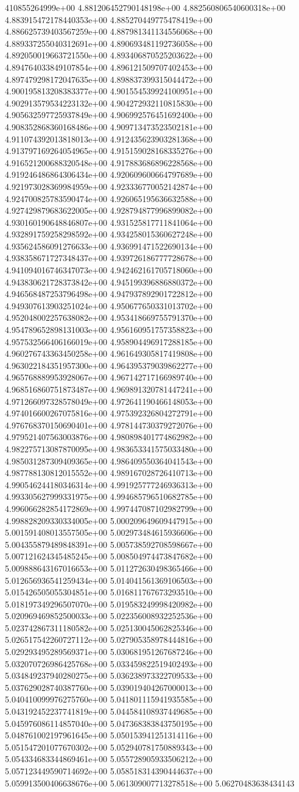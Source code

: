 410855264999e+00	4.881206452790148198e+00	4.882560806540600318e+00	4.883915472178440353e+00	4.885270449775478419e+00	4.886625739403567259e+00	4.887981341134556068e+00	4.889337255040312691e+00	4.890693481192736058e+00	4.892050019663721550e+00	4.893406870525203622e+00	4.894764033849107854e+00	4.896121509707402453e+00	4.897479298172047635e+00	4.898837399315044472e+00	4.900195813208383377e+00	4.901554539924100951e+00	4.902913579534223132e+00	4.904272932110815830e+00	4.905632597725937849e+00	4.906992576451692400e+00	4.908352868360168486e+00	4.909713473523502181e+00	4.911074392013818013e+00	4.912435623903281368e+00	4.913797169264054965e+00	4.915159028168335276e+00	4.916521200688320548e+00	4.917883686896228568e+00	4.919246486864306434e+00	4.920609600664797689e+00	4.921973028369984959e+00	4.923336770052142874e+00	4.924700825783590474e+00	4.926065195636632588e+00	4.927429879683622005e+00	4.928794877996899082e+00	4.930160190648846807e+00	4.931525817711841064e+00	4.932891759258298592e+00	4.934258015360627248e+00	4.935624586091276633e+00	4.936991471522690134e+00	4.938358671727348437e+00	4.939726186777728678e+00	4.941094016746347073e+00	4.942462161705718060e+00	4.943830621728373842e+00	4.945199396886880372e+00	4.946568487253796498e+00	4.947937892901722812e+00	4.949307613903251024e+00	4.950677650331013702e+00	4.952048002257638082e+00	4.953418669755791370e+00	4.954789652898131003e+00	4.956160951757358823e+00	4.957532566406166019e+00	4.958904496917288185e+00	4.960276743363450258e+00	4.961649305817419808e+00	4.963022184351957300e+00	4.964395379039862277e+00	4.965768889953928067e+00	4.967142717166989740e+00	4.968516860751873487e+00	4.969891320781447241e+00	4.971266097328578049e+00	4.972641190466148053e+00	4.974016600267075816e+00	4.975392326804272791e+00	4.976768370150690401e+00	4.978144730379272076e+00	4.979521407563003876e+00	4.980898401774862982e+00	4.982275713087870095e+00	4.983653341575033480e+00	4.985031287309409365e+00	4.986409550364041543e+00	4.987788130812015552e+00	4.989167028726410713e+00	4.990546244180346314e+00	4.991925777246936313e+00	4.993305627999331975e+00	4.994685796510682785e+00	4.996066282854172869e+00	4.997447087102982799e+00	4.998828209330334005e+00	5.000209649609447915e+00	5.001591408013557505e+00	5.002973484615936606e+00	5.004355879489848391e+00	5.005738592708598667e+00	5.007121624345485245e+00	5.008504974473847682e+00	5.009888643167016653e+00	5.011272630498365466e+00	5.012656936541259434e+00	5.014041561369106503e+00	5.015426505055304851e+00	5.016811767673293510e+00	5.018197349296507070e+00	5.019583249998420982e+00	5.020969469852500033e+00	5.022356008932252536e+00	5.023742867311180582e+00	5.025130045062825346e+00	5.026517542260727112e+00	5.027905358978444816e+00	5.029293495289569371e+00	5.030681951267687246e+00	5.032070726986425768e+00	5.033459822519402493e+00	5.034849237940280275e+00	5.036238973322709533e+00	5.037629028740387760e+00	5.039019404267000013e+00	5.040410099976275760e+00	5.041801115941935585e+00	5.043192452237741819e+00	5.044584108937449685e+00	5.045976086114857040e+00	5.047368383843750195e+00	5.048761002197961645e+00	5.050153941251314116e+00	5.051547201077670302e+00	5.052940781750889343e+00	5.054334683344869461e+00	5.055728905933506212e+00	5.057123449590714692e+00	5.058518314390444637e+00	5.059913500406638676e+00	5.061309007713278518e+00	5.06270483638434143